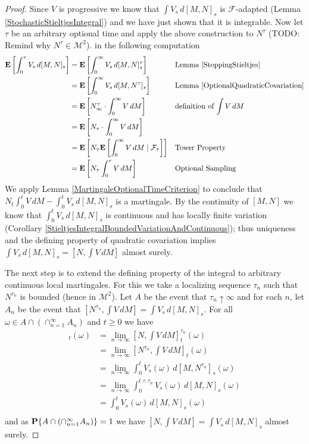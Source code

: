 \begin{proof}
Since $V$ is progressive we know that $\int V_s \, d[M,N]_s$ is $\mathcal{F}$-adapted (Lemma \ref{StochasticStieltjesIntegral}) and we have just shown that it is integrable.  Now let $\tau$ be an arbitrary optional time and apply the above construction to $N^\tau$ (TODO: Remind why $N^\tau \in \mathcal{M}^2$).  in the following computation
\begin{align*}
\expectation{\int_0^\tau V_s \, d[M,N]_s}  &=\expectation{ \int_0^\infty V_s \, d[M,N]^\tau_s} && \text{Lemma \ref{StoppingStieltjes}}\\
&=\expectation{ \int_0^\infty V_s \, d[M,N ^\tau]_s} && \text{Lemma \ref{OptionalQuadraticCovariation}}\\
&=\expectation{ N^\tau_\infty \cdot \int_0^\infty V \, dM} && \text{definition of $\int V \, dM$}\\
&=\expectation{ N_\tau \cdot \int_0^\infty V \, dM} \\
&=\expectation{ N_\tau \cexpectationlong{\mathcal{F}_\tau}{ \int_0^\infty V \, dM} } && \text{Tower Property}\\
&=\expectation{ N_\tau \int_0^\tau V \, dM}  && \text{Optional Sampling}\\
\end{align*}
We apply Lemma \ref{MartingaleOptionalTimeCriterion} to conclude that $N_t \int_0^t V \, dM - \int_0^t V_s \, d[M,N]_s$ is a martingale.  By the continuity of $[M,N]$ we know that $\int_0^t V_s \, d[M,N]_s$ is continuous and has locally finite variation (Corollary \ref{StieltjesIntegralBoundedVariationAndContinuous}); thus uniqueness and the defining property of quadratic covariation implies $\int V_s \, d[M,N]_s = [N, \int V \, dM]$ almost surely.

The next step is to extend the defining property of the integral to arbitrary continuous local martingales.  For this we take a localizing sequence $\tau_n$ such that $N^{\tau_n}$ is bounded (hence in $\mathcal{M}^2$).  Let $A$ be the event that $\tau_n \uparrow \infty$ and for each $n$, let $A_n$ be the event that $[N^{\tau_n}, \int V \, dM] = \int V_s \, d[M,N]_s$.  For all  $\omega \in A \cap \left(\cap_{n=1}^\infty A_n \right)$ and $t \geq 0$ we have 
\begin{align*}
[N, \int V \, dM]_t(\omega) &= \lim_{n \to \infty} [N, \int V \, dM]^{\tau_n}_t(\omega) \\
&= \lim_{n \to \infty} [N ^{\tau_n}, \int V \, dM]_t(\omega) \\
&= \lim_{n \to \infty} \int_0^t V_s(\omega) \, d[M,N^{\tau_n}]_s(\omega) \\
&= \lim_{n \to \infty} \int_0^{t \wedge \tau_n} V_s(\omega) \, d[M,N]_s(\omega) \\
&= \int_0^{t} V_s(\omega) \, d[M,N]_s(\omega) \\
\end{align*}
and as $\probability{A \cap \left(\cap_{n=1}^\infty A_n \right)} = 1$ we have $[N, \int V \, dM] = \int V_s \, d[M,N]_s$ almost surely.


\end{proof}
